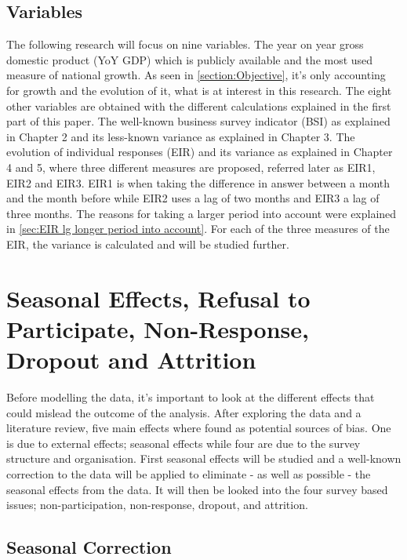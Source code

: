\documentclass[12pt,a4paper,oneside]{book}
\begin{document}
\section{Variables}

The following research will focus on nine variables. 
The year on year gross domestic product (YoY GDP) which is publicly available and the most used measure of national growth. As seen in \autoref{section:Objective}, it's only accounting for growth and the evolution of it, what is at interest in this research.
The eight other variables are obtained with the different calculations explained in the first part of this paper.
The well-known business survey indicator (BSI) as explained in Chapter 2 and its less-known variance as explained in Chapter 3.
The evolution of individual responses (EIR) and its variance as explained in Chapter 4 and 5, where three different measures are proposed, referred later as EIR1, EIR2 and EIR3. 
EIR1 is when taking the difference in answer between a month and the month before while EIR2 uses a lag of two months and EIR3 a lag of three months. The reasons for taking a larger period into account were explained in \autoref{sec:EIR lg longer period into account}.
For each of the three measures of the EIR, the variance is calculated and will be studied further.



\chapter{Seasonal Effects, Refusal to Participate, Non-Response, Dropout and Attrition}
\label{chap:nonresponse dropout}

Before modelling the data, it's important to look at the different effects that could mislead the outcome of the analysis. After exploring the data and a literature review, five main effects where found as potential sources of bias. 
One is due to external effects; seasonal effects while four are due to the survey structure and organisation.
First seasonal effects will be studied and a well-known correction to the data will be applied to eliminate - as well as possible - the seasonal effects from the data.
It will then be looked into the four survey based issues; non-participation, non-response, dropout, and attrition.


\section{Seasonal Correction}
\label{sec:seasonal correction}
\end{document}
